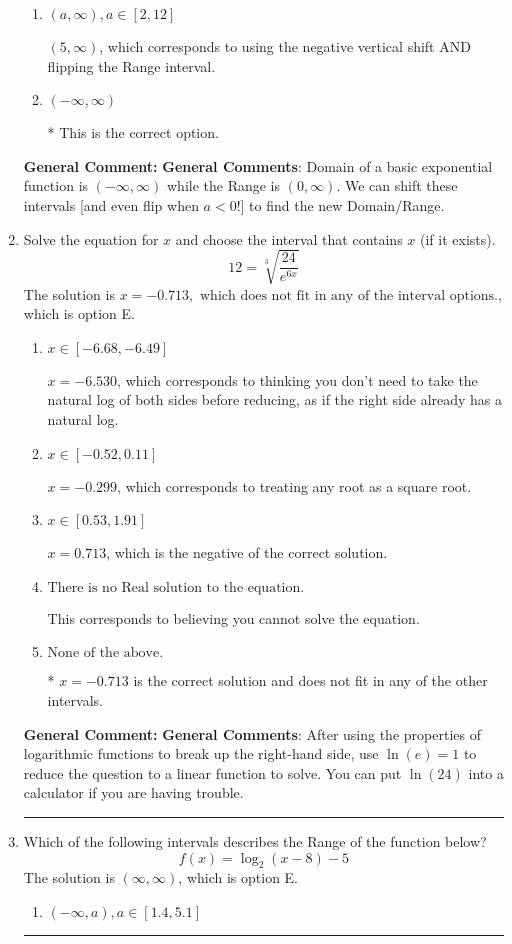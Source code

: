 \documentclass{extbook}[14pt]
\newcommand{\litem}[1]{\item #1

\rule{\textwidth}{0.4pt}}
\begin{document}
\begin{enumerate}
{\begin{enumerate}[label=\Alph*.]
$[5, \infty)$, which corresponds to using the negative vertical shift AND flipping the Range interval AND including the endpoint.
\item \( (a, \infty), a \in [2, 12] \)

$(5, \infty)$, which corresponds to using the negative vertical shift AND flipping the Range interval.
\item \( (-\infty, \infty) \)

* This is the correct option.
\end{enumerate}

\textbf{General Comment:} \textbf{General Comments}: Domain of a basic exponential function is $(-\infty, \infty)$ while the Range is $(0, \infty)$. We can shift these intervals [and even flip when $a<0$!] to find the new Domain/Range.
}
\litem{
 Solve the equation for $x$ and choose the interval that contains $x$ (if it exists).
\[  12 = \sqrt[3]{\frac{24}{e^{6x}}} \]The solution is \( x = -0.713, \text{ which does not fit in any of the interval options.} \), which is option E.\begin{enumerate}[label=\Alph*.]
\item \( x \in [-6.68, -6.49] \)

$x = -6.530$, which corresponds to thinking you don't need to take the natural log of both sides before reducing, as if the right side already has a natural log.
\item \( x \in [-0.52, 0.11] \)

$x = -0.299$, which corresponds to treating any root as a square root.
\item \( x \in [0.53, 1.91] \)

$x = 0.713$, which is the negative of the correct solution.
\item \( \text{There is no Real solution to the equation.} \)

This corresponds to believing you cannot solve the equation.
\item \( \text{None of the above.} \)

* $x = -0.713$ is the correct solution and does not fit in any of the other intervals.
\end{enumerate}

\textbf{General Comment:} \textbf{General Comments}: After using the properties of logarithmic functions to break up the right-hand side, use $\ln(e) = 1$ to reduce the question to a linear function to solve. You can put $\ln(24)$ into a calculator if you are having trouble.
}
\litem{
Which of the following intervals describes the Range of the function below?
\[ f(x) = \log_2{(x-8)}-5 \]The solution is \( (\infty, \infty) \), which is option E.\begin{enumerate}[label=\Alph*.]
\item \( (-\infty, a), a \in [1.4, 5.1] \)


\end{enumerate}}
\end{enumerate}
\end{document}
